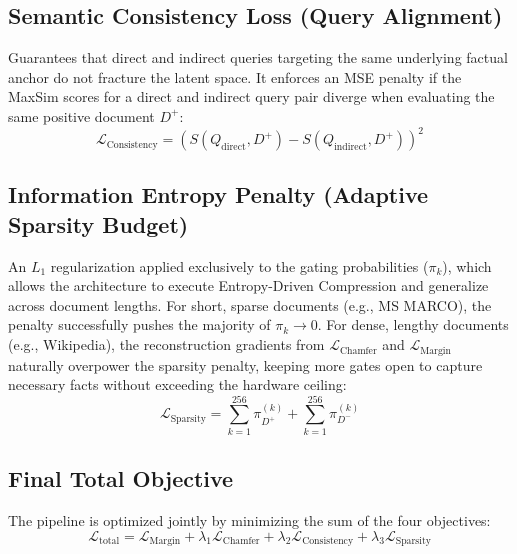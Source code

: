 \documentclass[11pt, a4paper]{article}
\begin{document}
\subsection{Semantic Consistency Loss (Query Alignment)}
Guarantees that direct and indirect queries targeting the same underlying factual anchor do not fracture the latent space. It enforces an MSE penalty if the MaxSim scores for a direct and indirect query pair diverge when evaluating the same positive document $D^+$:
\begin{equation}
    \mathcal{L}_{\text{Consistency}} = \left( S(Q_{\text{direct}}, D^+) - S(Q_{\text{indirect}}, D^+) \right)^2
\end{equation}

\subsection{Information Entropy Penalty (Adaptive Sparsity Budget)}
An $L_1$ regularization applied exclusively to the gating probabilities ($\pi_k$), which allows the architecture to execute Entropy-Driven Compression and generalize across document lengths. For short, sparse documents (e.g., MS MARCO), the penalty successfully pushes the majority of $\pi_k \to 0$. For dense, lengthy documents (e.g., Wikipedia), the reconstruction gradients from $\mathcal{L}_{\text{Chamfer}}$ and $\mathcal{L}_{\text{Margin}}$ naturally overpower the sparsity penalty, keeping more gates open to capture necessary facts without exceeding the hardware ceiling:
\begin{equation}
    \mathcal{L}_{\text{Sparsity}} = \sum_{k=1}^{256} \pi_{D^+}^{(k)} + \sum_{k=1}^{256} \pi_{D^-}^{(k)}
\end{equation}

\subsection{Final Total Objective}
The pipeline is optimized jointly by minimizing the sum of the four objectives:
\begin{equation}
    \mathcal{L}_{\text{total}} = \mathcal{L}_{\text{Margin}} + \lambda_1 \mathcal{L}_{\text{Chamfer}} + \lambda_2 \mathcal{L}_{\text{Consistency}} + \lambda_3 \mathcal{L}_{\text{Sparsity}}
\end{equation}
\end{document}
